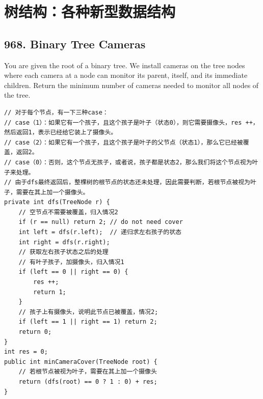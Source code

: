 \documentclass[9pt, b5paper]{article}
\begin{document}
\section{树结构：各种新型数据结构}
\label{sec-8}

\subsection{968. Binary Tree Cameras}
\label{sec-8-1}
You are given the root of a binary tree. We install cameras on the tree nodes where each camera at a node can monitor its parent, itself, and its immediate children.
Return the minimum number of cameras needed to monitor all nodes of the tree.
\begin{verbatim}
// 对于每个节点，有一下三种case：
// case（1）：如果它有一个孩子，且这个孩子是叶子（状态0），则它需要摄像头，res ++，然后返回1，表示已经给它装上了摄像头。
// case（2）：如果它有一个孩子，且这个孩子是叶子的父节点（状态1），那么它已经被覆盖，返回2。
// case（0）：否则，这个节点无孩子，或者说，孩子都是状态2，那么我们将这个节点视为叶子来处理。
// 由于dfs最终返回后，整棵树的根节点的状态还未处理，因此需要判断，若根节点被视为叶子，需要在其上加一个摄像头。
private int dfs(TreeNode r) {
    // 空节点不需要被覆盖，归入情况2
    if (r == null) return 2; // do not need cover
    int left = dfs(r.left);  // 递归求左右孩子的状态
    int right = dfs(r.right);
    // 获取左右孩子状态之后的处理
    // 有叶子孩子，加摄像头，归入情况1
    if (left == 0 || right == 0) {
        res ++;
        return 1;
    }
    // 孩子上有摄像头，说明此节点已被覆盖，情况2; 
    if (left == 1 || right == 1) return 2;
    return 0;
}
int res = 0;
public int minCameraCover(TreeNode root) {
    // 若根节点被视为叶子，需要在其上加一个摄像头
    return (dfs(root) == 0 ? 1 : 0) + res;
}
\end{verbatim}
\end{document}
